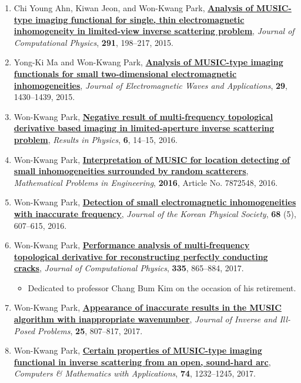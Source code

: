 \documentclass[10pt,A4]{article}
\begin{document}
\begin{enumerate}
\item\label{A-JCOMP2015B} Chi Young Ahn, Kiwan Jeon, and Won-Kwang Park, \href{http://dx.doi.org/10.1016/j.jcp.2015.03.018}{\textbf{Analysis of MUSIC-type imaging functional for single, thin electromagnetic inhomogeneity in limited-view inverse scattering problem}}, \textit{Journal of Computational Physics}, \textbf{291}, 198--217, 2015.
\item\label{A-JEMWA2015} Yong-Ki Ma and Won-Kwang Park, \href{http://dx.doi.org/10.1080/09205071.2015.1047468}{\textbf{Analysis of MUSIC-type imaging functionals for small two-dimensional electromagnetic inhomogeneities}}, \textit{Journal of Electromagnetic Waves and Applications}, \textbf{29}, 1430--1439, 2015.
\item\label{A-RINP2016} Won-Kwang Park, \href{http://dx.doi.org/10.1016/j.rinp.2015.11.007}{\textbf{Negative result of multi-frequency topological derivative based imaging in limited-aperture inverse scattering problem}}, \textit{Results in Physics}, \textbf{6}, 14--15, 2016.
\item\label{A-MPE2016} Won-Kwang Park, \href{http://dx.doi.org/10.1155/2016/7872548}{\textbf{Interpretation of MUSIC for location detecting of small inhomogeneities surrounded by random scatterers}}, \textit{Mathematical Problems in Engineering}, \textbf{2016}, Article No. 7872548, 2016.
\item\label{A-JKPS2016} Won-Kwang Park, \href{http://dx.doi.org/10.3938/jkps.68.607}{\textbf{Detection of small electromagnetic inhomogeneities with inaccurate frequency}}, \textit{Journal of the Korean Physical Society}, \textbf{68} (5), 607--615, 2016.
\item\label{A-JCOMP2017A} Won-Kwang Park, \href{http://dx.doi.org/10.1016/j.jcp.2017.02.007}{\textbf{Performance analysis of multi-frequency topological derivative for reconstructing perfectly conducting cracks}}, \textit{Journal of Computational Physics}, \textbf{335}, 865--884, 2017.
    \begin{itemize}
      \item Dedicated to professor Chang Bum Kim on the occasion of his retirement.
    \end{itemize}
\item\label{A-JIILP2017} Won-Kwang Park, \href{http://dx.doi.org/10.1515/jiip-2016-0030}{\textbf{Appearance of inaccurate results in the MUSIC algorithm with inappropriate wavenumber}}, \textit{Journal of Inverse and Ill-Posed Problems}, \textbf{25}, 807--817, 2017.
\item\label{A-CAMWA2017A}  Won-Kwang Park, \href{http://dx.doi.org/10.1016/j.camwa.2017.06.009}{\textbf{Certain properties of MUSIC-type imaging functional in inverse scattering from an open, sound-hard arc}}, \textit{Computers \& Mathematics with Applications}, \textbf{74}, 1232--1245, 2017.

\end{enumerate}
\end{document}
